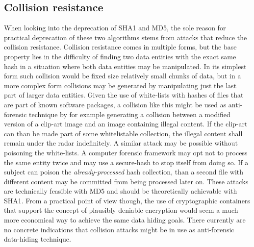 \subsection{Collision resistance}
When looking into the deprecation of SHA1 and MD5, the sole reason for practical deprecation of these two algorithms stems from attacks that reduce the collision resistance. Collision resistance comes in multiple forms, but the base property lies in the difficulty of finding two data entities with the exact same hash in a situation where both data entities may be manipulated. In its simplest form such collision would be fixed size relatively small chunks of data, but in a more complex form collisions may be generated by manipulating just the last part of larger data entities. Given the use of white-lists with hashes of files that are part of known software packages, a collision like this might be used as anti-forensic technique by for example generating a collision between a modified version of a clip-art image and an image containing illegal content. If the clip-art can than be made part of some whitelistable collection, the illegal content shall remain under the radar indefinitely. A similar attack may be possible without poisoning the white-lists. A computer forensic framework may opt not to process the same entity twice and may use a secure-hash to stop itself from doing so. If a subject can poison the \emph{already-processed} hash collection, than a second file with different content may be committed from being processed later on. These attacks are technically feasible with MD5 and should be theoretically achievable with SHA1. From a practical point of view though, the use of cryptographic containers that support the concept of plausibly deniable encryption would seem a much more economical way to achieve the same data hiding goals. There currently are no concrete indications that collision attacks might be in use as anti-forensic data-hiding technique. 
